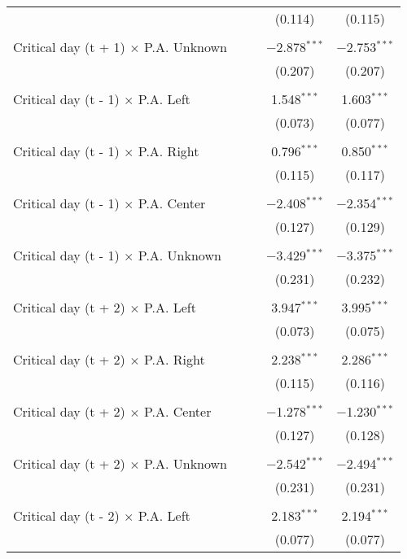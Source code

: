 \documentclass[
]{article}
\begin{document}
\begin{table}[!htbp]
{\begin{tabular}{@{\extracolsep{5pt}}lcccc}
  &  &  & (0.114) & (0.115) \\ 
  & & & & \\ 
 Critical day (t + 1) $\times$ P.A. Unknown &  &  & $-$2.878$^{***}$ & $-$2.753$^{***}$ \\ 
  &  &  & (0.207) & (0.207) \\ 
  & & & & \\ 
 Critical day (t - 1) $\times$ P.A. Left &  &  & 1.548$^{***}$ & 1.603$^{***}$ \\ 
  &  &  & (0.073) & (0.077) \\ 
  & & & & \\ 
 Critical day (t - 1) $\times$ P.A. Right &  &  & 0.796$^{***}$ & 0.850$^{***}$ \\ 
  &  &  & (0.115) & (0.117) \\ 
  & & & & \\ 
 Critical day (t - 1) $\times$ P.A. Center &  &  & $-$2.408$^{***}$ & $-$2.354$^{***}$ \\ 
  &  &  & (0.127) & (0.129) \\ 
  & & & & \\ 
 Critical day (t - 1) $\times$ P.A. Unknown &  &  & $-$3.429$^{***}$ & $-$3.375$^{***}$ \\ 
  &  &  & (0.231) & (0.232) \\ 
  & & & & \\ 
 Critical day (t + 2) $\times$ P.A. Left &  &  & 3.947$^{***}$ & 3.995$^{***}$ \\ 
  &  &  & (0.073) & (0.075) \\ 
  & & & & \\ 
 Critical day (t + 2) $\times$ P.A. Right &  &  & 2.238$^{***}$ & 2.286$^{***}$ \\ 
  &  &  & (0.115) & (0.116) \\ 
  & & & & \\ 
 Critical day (t + 2) $\times$ P.A. Center &  &  & $-$1.278$^{***}$ & $-$1.230$^{***}$ \\ 
  &  &  & (0.127) & (0.128) \\ 
  & & & & \\ 
 Critical day (t + 2) $\times$ P.A. Unknown &  &  & $-$2.542$^{***}$ & $-$2.494$^{***}$ \\ 
  &  &  & (0.231) & (0.231) \\ 
  & & & & \\ 
 Critical day (t - 2) $\times$ P.A. Left &  &  & 2.183$^{***}$ & 2.194$^{***}$ \\ 
  &  &  & (0.077) & (0.077) \\ 

\end{tabular}}
\end{table}
\end{document}
